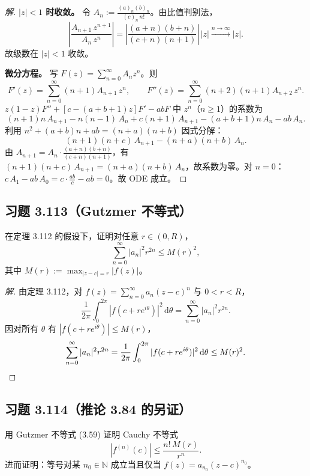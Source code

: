 \documentclass[11pt,a4paper]{article}
\newcommand{\N}{\mathbb{N}}
\newcommand{\dd}{\mathrm{d}}
\theoremstyle{definition}
\newenvironment{solution}{\begin{proof}[解]}{\end{proof}}
\begin{document}
\begin{solution}
  \textbf{$|z| < 1$ 时收敛。}\;
  令 $A_n := \frac{(a)_n(b)_n}{(c)_n\,n!}$。由比值判别法，
  \[
    \left|\frac{A_{n+1}\,z^{n+1}}{A_n\,z^n}\right|
    = \left|\frac{(a+n)(b+n)}{(c+n)(n+1)}\right|\,|z|
    \xrightarrow{n\to\infty}|z|.
  \]
  故级数在 $|z| < 1$ 收敛。

  \textbf{微分方程。}\;
  写 $F(z) = \sum_{n=0}^{\infty} A_n z^n$。则
  \[
    F'(z) = \sum_{n=0}^{\infty} (n+1)A_{n+1}\,z^n,
    \qquad
    F''(z) = \sum_{n=0}^{\infty} (n+2)(n+1)A_{n+2}\,z^n.
  \]
  $z(1-z)F'' + [c-(a+b+1)z]F' - abF$ 中 $z^n$（$n \ge 1$）的系数为
  \[
    (n+1)n\,A_{n+1} - n(n-1)\,A_n
    + c(n+1)\,A_{n+1} - (a+b+1)n\,A_n - ab\,A_n.
  \]
  利用 $n^2 + (a+b)n + ab = (n+a)(n+b)$ 因式分解：
  \[
    (n+1)(n+c)\,A_{n+1} - (n+a)(n+b)\,A_n.
  \]
  由 $A_{n+1} = A_n \cdot \frac{(a+n)(b+n)}{(c+n)(n+1)}$，有 $(n+1)(n+c)\,A_{n+1} = (n+a)(n+b)\,A_n$，故系数为零。对 $n = 0$：$c\,A_1 - ab\,A_0 = c \cdot \frac{ab}{c} - ab = 0$。故 ODE 成立。\qedhere
\end{solution}

\subsection{习题 3.113（Gutzmer 不等式）}

在定理 3.112 的假设下，证明对任意 $r \in (0, R)$，
\[
  \sum_{n=0}^{\infty} |a_n|^2 r^{2n} \le M(r)^2,
\]
其中 $M(r) := \max_{|z-c|=r} |f(z)|$。

\begin{solution}
  由定理 3.112，对 $f(z) = \sum_{n=0}^{\infty} a_n(z-c)^n$ 与 $0 < r < R$，
  \[
    \frac{1}{2\pi}\int_0^{2\pi}|f(c+re^{i\theta})|^2\,\dd\theta
    = \sum_{n=0}^{\infty}|a_n|^2 r^{2n}.
  \]
  因对所有 $\theta$ 有 $|f(c+re^{i\theta})| \le M(r)$，
  \[
    \sum_{n=0}^{\infty}|a_n|^2 r^{2n}
    = \frac{1}{2\pi}\int_0^{2\pi}|f(c+re^{i\theta})|^2\,\dd\theta
    \le M(r)^2.\qedhere
  \]
\end{solution}

\subsection{习题 3.114（推论 3.84 的另证）}

用 Gutzmer 不等式 (3.59) 证明 Cauchy 不等式
\[
  |f^{(n)}(c)| \le \frac{n!\,M(r)}{r^n}.
\]
进而证明：等号对某 $n_0 \in \N$ 成立当且仅当 $f(z) = a_{n_0}(z-c)^{n_0}$。
\end{document}
